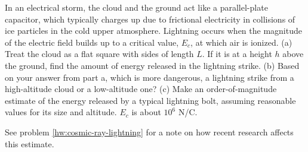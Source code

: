 In an electrical storm, the cloud and the ground act like   
a parallel-plate capacitor, which typically charges up due
to frictional electricity in collisions of ice particles in   
the cold upper atmosphere. Lightning occurs when the
magnitude of the electric field builds up to a critical
value, $E_c$, at which air is ionized.\hwendpart
(a) Treat the cloud as a flat square with sides of length
$L$. If it is at a height $h$ above the ground, find the
amount of energy released in the lightning strike.\answercheck\hwendpart
(b) Based on your answer from part a, which is more
dangerous, a lightning strike from a high-altitude cloud
or a low-altitude one?\hwendpart
(c) Make an order-of-magnitude estimate of the energy
released by a typical lightning bolt, assuming reasonable
values for its size and altitude.  $E_c$ is about $10^6$  N/C.

See problem \ref{hw:cosmic-ray-lightning} for a note on how recent research affects this estimate.
